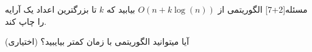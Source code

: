 
‌مسئله[2+7]
الگوریتمی از
$O(n+k\log(n))$
بیابید که
$k$
تا بزرگترین اعداد یک آرایه را چاپ کند.

آیا میتوانید الگوریتمی با زمان کمتر بیایبید؟ (اختیاری) 













